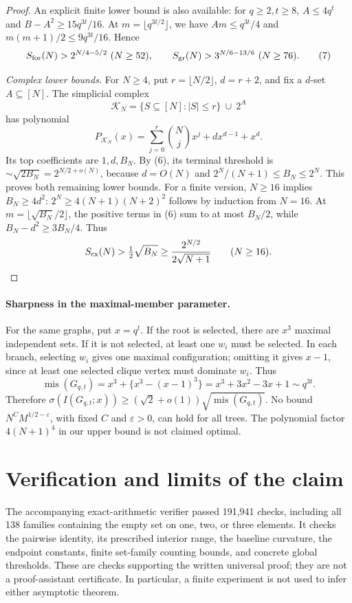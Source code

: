 \documentclass[11pt]{article}
\newcommand{\mis}{\operatorname{mis}}
\begin{document}
\begin{proof}
An explicit finite lower bound is also available: for $q\ge2,t\ge8$,
$A\le4q^t$ and $B-A^2\ge15q^{3t}/16$. At
$m=\lfloor q^{3t/2}\rfloor$, we have
$Am\le q^{3t}/4$ and $m(m+1)/2\le9q^{3t}/16$.
Hence
\[
 S_{\rm for}(N)>2^{N/4-5/2}\ (N\ge52),\qquad
 S_{\rm gr}(N)>3^{N/6-13/6}\ (N\ge76).
\tag{7}
\]

\smallskip\noindent\textit{Complex lower bounds.}
For $N\ge4$, put $r=\lfloor N/2\rfloor$, $d=r+2$, and fix a $d$-set
$A\subseteq[N]$. The simplicial complex
\[
 \mathcal K_N=\{S\subseteq[N]:|S|\le r\}\ \cup\ 2^A
\]
has polynomial
\[
 P_{\mathcal K_N}(x)=\sum_{j=0}^{r}\binom Njx^j+dx^{d-1}+x^d.
\]
Its top coefficients are $1,d,B_N$. By (6), its terminal threshold is
$\sim\sqrt{2B_N}=2^{N/2+o(N)}$, because $d=O(N)$ and
$2^N/(N+1)\le B_N\le2^N$. This proves both remaining lower bounds.
For a finite version, $N\ge16$ implies $B_N\ge4d^2$:
$2^N\ge4(N+1)(N+2)^2$ follows by induction from $N=16$.
At $m=\lfloor\sqrt{B_N}/2\rfloor$, the positive terms in (6) sum to
at most $B_N/2$, while $B_N-d^2\ge3B_N/4$. Thus
\[
 S_{\rm cx}(N)>\tfrac12\sqrt{B_N}
 \ge\frac{2^{N/2}}{2\sqrt{N+1}}\qquad(N\ge16).
\]
\end{proof}

\paragraph{Sharpness in the maximal-member parameter.}
For the same graphs, put $x=q^t$. If the root is selected, there are
$x^3$ maximal independent sets. If it is not selected, at least one
$w_i$ must be selected. In each branch, selecting $w_i$ gives one maximal
configuration; omitting it gives $x-1$, since at least one selected clique
vertex must dominate $w_i$. Thus
\[
 \mis(G_{q,t})=x^3+\{x^3-(x-1)^3\}
             =x^3+3x^2-3x+1\sim q^{3t}.
\]
Therefore $\sigma(I(G_{q,t};x))\ge(\sqrt2+o(1))\sqrt{\mis(G_{q,t})}$.
No bound $N^C M^{1/2-\varepsilon}$, with fixed $C$ and
$\varepsilon>0$, can hold for all trees. The polynomial factor $4(N+1)^4$
in our upper bound is not claimed optimal.

\section{Verification and limits of the claim}
The accompanying exact-arithmetic verifier passed 191,941 checks, including
all 138 families containing the empty set on one, two, or three elements.
It checks the pairwise identity,
its prescribed interior range, the baseline curvature, the endpoint
constants, finite set-family counting bounds, and concrete global
thresholds. These are checks supporting the written universal proof;
they are not a proof-assistant certificate. In particular, a finite
experiment is not used to infer either asymptotic theorem.
\end{document}

